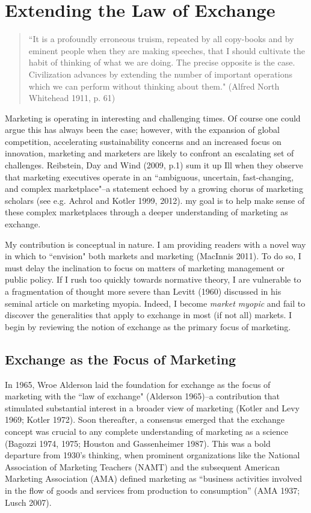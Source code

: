 \chapter{Extending the Law of Exchange\label{law}}

\begin{small}
\begin{quote}
``It is a profoundly erroneous truism, repeated by all copy-books and by eminent people when they are making speeches, that I should cultivate the habit of thinking of what we are doing. The precise opposite is the case. Civilization advances by extending the number of important operations which we can perform without thinking about them."	
(Alfred North Whitehead 1911, p. 61)
\end{quote}
\end{small}

Marketing is operating in interesting and challenging times. Of course one could argue this has always been the case; however, with the expansion of global competition, accelerating sustainability concerns and an increased focus on innovation, marketing and marketers are likely to confront an escalating set of challenges. Reibstein, Day and Wind (2009, p.1) sum it up Ill when they observe that marketing executives operate in an ``ambiguous, uncertain, fast-changing, and complex marketplace"--a statement echoed by a growing chorus of marketing scholars (see e.g. Achrol and Kotler 1999, 2012). my goal is to help make sense of these complex marketplaces through a deeper understanding of marketing as exchange. 

My contribution is conceptual in nature. I am providing readers with a novel way in which to ``envision" both markets and marketing (MacInnis 2011). To do so, I must delay the inclination to focus on matters of marketing management or public policy. If I rush too quickly towards normative theory, I are vulnerable to a fragmentation of thought more severe than Levitt (1960) discussed in his seminal article on marketing myopia. Indeed, I become \emph{market myopic} and fail to discover the generalities that apply to exchange in most (if not all) markets. I begin by reviewing the notion of exchange as the primary focus of marketing. 

\section{Exchange as the Focus of Marketing}
In 1965, Wroe Alderson laid the foundation for exchange as the focus of marketing with the ``law of exchange"  (Alderson 1965)--a contribution that stimulated substantial interest in a broader view of marketing (Kotler and Levy 1969; Kotler 1972).  Soon thereafter, a consensus emerged that the exchange concept was crucial to any complete understanding of marketing as a science (Bagozzi 1974, 1975; Houston and Gassenheimer 1987). This was a bold departure from 1930's thinking, when prominent organizations like the National Association of Marketing Teachers (NAMT) and the subsequent American Marketing Association (AMA) defined marketing as ``business activities involved in the flow of goods and services from production to consumption'' (AMA 1937; Lusch 2007). 

